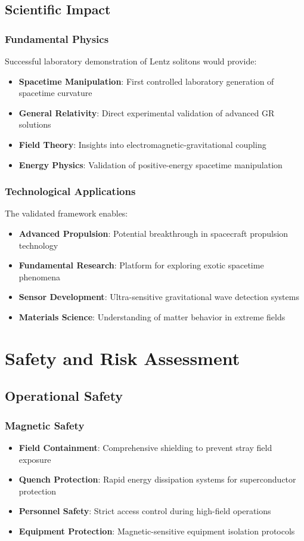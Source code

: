 \documentclass[12pt,a4paper]{article}
\begin{document}
\subsection{Scientific Impact}

\subsubsection{Fundamental Physics}
Successful laboratory demonstration of Lentz solitons would provide:
\begin{itemize}
\item \textbf{Spacetime Manipulation}: First controlled laboratory generation of spacetime curvature
\item \textbf{General Relativity}: Direct experimental validation of advanced GR solutions
\item \textbf{Field Theory}: Insights into electromagnetic-gravitational coupling
\item \textbf{Energy Physics}: Validation of positive-energy spacetime manipulation
\end{itemize}

\subsubsection{Technological Applications}
The validated framework enables:
\begin{itemize}
\item \textbf{Advanced Propulsion}: Potential breakthrough in spacecraft propulsion technology
\item \textbf{Fundamental Research}: Platform for exploring exotic spacetime phenomena
\item \textbf{Sensor Development}: Ultra-sensitive gravitational wave detection systems
\item \textbf{Materials Science}: Understanding of matter behavior in extreme fields
\end{itemize}

\section{Safety and Risk Assessment}

\subsection{Operational Safety}

\subsubsection{Magnetic Safety}
\begin{itemize}
\item \textbf{Field Containment}: Comprehensive shielding to prevent stray field exposure
\item \textbf{Quench Protection}: Rapid energy dissipation systems for superconductor protection
\item \textbf{Personnel Safety}: Strict access control during high-field operations
\item \textbf{Equipment Protection}: Magnetic-sensitive equipment isolation protocols
\end{itemize}
\end{document}
